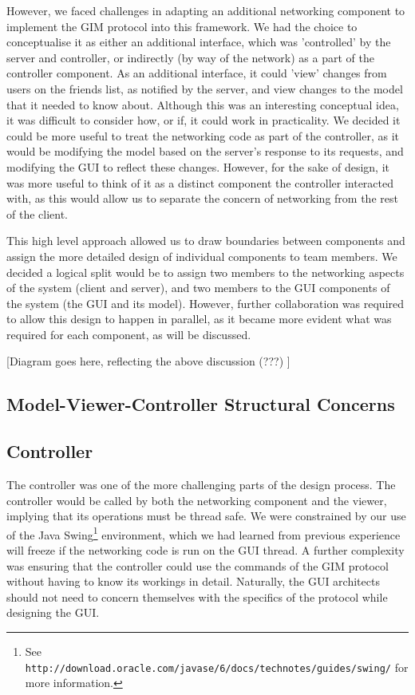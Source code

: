However, we faced challenges in adapting an additional networking component to implement the GIM protocol into this framework. We had the choice to conceptualise it as either an additional interface, which was 'controlled' by the server and controller, or indirectly (by way of the network) as a part of the controller component. As an additional interface, it could 'view' changes from users on the friends list, as notified by the server, and view changes to the model that it needed to know about. Although this was an interesting conceptual idea, it was difficult to consider how, or if, it could work in practicality. We decided it could be more useful to treat the networking code as part of the controller, as it would be modifying the model based on the server's response to its requests, and modifying the GUI to reflect these changes. However, for the sake of design, it was more useful to think of it as a distinct component the controller interacted with, as this would allow us to separate the concern of networking from the rest of the client.
	
This high level approach allowed us to draw boundaries between components and assign the more detailed design of individual components to team members. We decided a logical split would be to assign two members to the networking aspects of the system (client and server), and two members to the GUI components of the system (the GUI and its model). However, further collaboration was required to allow this design to happen in parallel, as it became more evident what was required for each component, as will be discussed.

[Diagram goes here, reflecting the above discussion (???) ]

\subsection {Model-Viewer-Controller Structural Concerns}

\subsection {Controller}
\label{controller}

The controller was one of the more challenging parts of the design process. The controller would be called by both the networking component and the viewer, implying that its operations must be thread safe. We were constrained by our use of the Java Swing\footnote{See \texttt{http://download.oracle.com/javase/6/docs/technotes/guides/swing/} for more information.} environment, which we had learned from previous experience will freeze if the networking code is run on the GUI thread. A further complexity was ensuring that the controller could use the commands of the GIM protocol without having to know its workings in detail. Naturally, the GUI architects should not need to concern themselves with the specifics of the protocol while designing the GUI.

